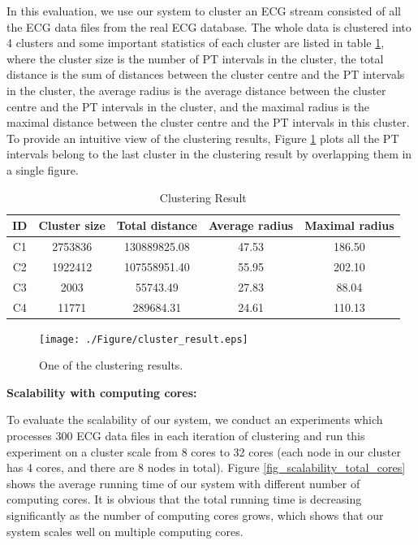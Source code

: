\documentclass[conference]{IEEEtran}
\begin{document}
In this evaluation, we use our system to cluster an ECG stream consisted of all the ECG data files from the real ECG database. The whole data is clustered into 4 clusters and some important statistics of each cluster are listed in table \ref{tb_clustering_result}, where the cluster size is the number of PT intervals in the cluster, the total distance is the sum of distances between the cluster centre and the PT intervals in the cluster, the average radius is the average distance between the cluster centre and the PT intervals in the cluster, and the maximal radius is the maximal distance between the cluster centre and the PT intervals in this cluster. To provide an intuitive view of the clustering results, Figure \ref{fig_clustering_result} plots all the PT intervals belong to the last cluster in the clustering result by overlapping them in a single figure.
\begin{table}[!t]\caption{Clustering Result}
\label{tb_clustering_result}
\centering
\begin{tabular}{|c|c|c|c|c|}
\hline
ID & Cluster size & Total distance & Average radius & Maximal radius\\
\hline
C1 & 2753836 & 130889825.08 & 47.53 & 186.50 \\
C2 & 1922412 & 107558951.40 & 55.95 & 202.10 \\
C3 & 2003 & 55743.49 & 27.83 & 88.04 \\
C4 & 11771 & 289684.31 & 24.61 & 110.13 \\
\hline
\end{tabular}
\end{table}

\begin{figure}[!t]
\centering
\texttt{[image: ./Figure/cluster\_result.eps]}
\caption{One of the clustering results.}
\label{fig_clustering_result}
\end{figure}

\textbf{Scalability with computing cores:}


To evaluate the scalability of our system, we conduct an experiments which processes 300 ECG data files in each iteration of clustering and run this experiment on a cluster scale from 8 cores to 32 cores (each node in our cluster has 4 cores, and there are 8 nodes in total). Figure \ref{fig_scalability_total_cores} shows the average running time of our system with different number of computing cores. It is obvious that the total running time is decreasing significantly as the number of computing cores grows, which shows that our system scales well on multiple computing cores. 
\end{document}
